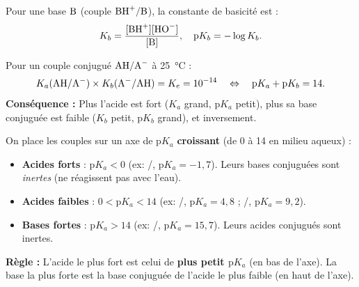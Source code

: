\documentclass[11pt]{article}
\newcommand{\cle}[1]{{\popxbold\color{popdark}#1}}
\begin{document}
\begin{definition}
Pour une base $\ce{B}$ (couple $\ce{BH+}/\ce{B}$), la \cle{constante de basicité} est :
\[ K_b = \frac{[\ce{BH+}][\ce{HO-}]}{[\ce{B}]}, \quad \mathrm{p}K_b = -\log K_b. \]
\end{definition}

\begin{propriete}[Relation fondamentale $K_a \times K_b = K_e$]
Pour un couple conjugué $\ce{AH}/\ce{A-}$ à \SI{25}{\celsius} :
\[ K_a(\ce{AH}/\ce{A-}) \times K_b(\ce{A-}/\ce{AH}) = K_e = 10^{-14} \quad\Leftrightarrow\quad \mathrm{p}K_a + \mathrm{p}K_b = 14. \]
\textbf{Conséquence :} Plus l'acide est fort ($K_a$ grand, $\mathrm{p}K_a$ petit), plus sa base conjuguée est faible ($K_b$ petit, $\mathrm{p}K_b$ grand), et inversement.
\end{propriete}

\begin{aretenir}
On place les couples sur un axe de $\mathrm{p}K_a$ \textbf{croissant} (de 0 à 14 en milieu aqueux) :
\begin{itemize}
\item \textbf{Acides forts} : $\mathrm{p}K_a < 0$ (ex: /, $\mathrm{p}K_a = -1,7$). Leurs bases conjuguées sont \emph{inertes} (ne réagissent pas avec l'eau).
\item \textbf{Acides faibles} : $0 < \mathrm{p}K_a < 14$ (ex: /, $\mathrm{p}K_a = 4,8$ ; /, $\mathrm{p}K_a = 9,2$).
\item \textbf{Bases fortes} : $\mathrm{p}K_a > 14$ (ex: /, $\mathrm{p}K_a = 15,7$). Leurs acides conjugués sont inertes.
\end{itemize}
\textbf{Règle :} L'acide le plus fort est celui de \textbf{plus petit $\mathrm{p}K_a$} (en bas de l'axe). La base la plus forte est la base conjuguée de l'acide le plus faible (en haut de l'axe).
\end{aretenir}
\end{document}
